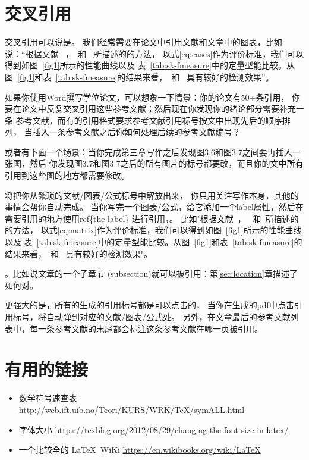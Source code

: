 \section{交叉引用}\label{sec:ref}
交叉引用可以说是。
我们经常需要在论文中引用文献和文章中的图表，比如说：“根据文献
~\cite{shen2017label}，~\cite{shen2016object}和~\cite{shen2017deepskeleton}
所描述的的方法，
以式\ref{eq:cases}作为评价标准，我们可以得到如图~\ref{fig1}所示的性能曲线以及
表~\ref{tab:sk-fmeasure}中的定量型能比较。从图~\ref{fig1}和表~\ref{tab:sk-fmeasure}的结果来看，~\cite{shen2016object}和~\cite{shen2017deepskeleton}
具有较好的检测效果”。

如果你使用Word撰写学位论文，可以想象一下情景：你的论文有50+条引用，
你要在论文中反复交叉引用这些参考文献；然后现在你发现你的绪论部分需要补充一条
参考文献，而有的引用格式要求参考文献引用标号按文中出现先后的顺序排列，
当插入一条参考文献之后你如何处理后续的参考文献编号？


或者有下面一个场景：当你完成第三章写作之后发现图3.6和图3.7之间要再插入一张图，然后
你发现图3.7和图3.7之后的所有图片的标号都要改，而且你的文中所有引用到这些图的地方都需要修改。

\textbf{}将把你从繁琐的文献/图表/公式标号中解放出来，
你只用关注写作本身，其他的事情会帮你自动完成。
%
当你写完一个图表/公式，给它添加一个label属性，然后在需要引用的地方使用ref\{the-label\}
进行引用，。
%
比如"根据文献~\cite{shen2017label}，~\cite{shen2016object}
和~\cite{shen2017deepskeleton}所描述的的方法，
以式\ref{eq:matrix}作为评价标准，我们可以得到如图~\ref{fig1}所示的性能曲线以及
表~\ref{tab:sk-fmeasure}中的定量型能比较。从图~\ref{fig1}和表~\ref{tab:sk-fmeasure}的结果来看，~\cite{shen2016object}和~\cite{shen2017deepskeleton}
具有较好的检测效果"。

。比如说文章的一个子章节
(subsection)就可以被引用：第\ref{sec:location}章描述了如何对。

更强大的是，所有的生成的引用标号都是可以点击的，
当你在生成的pdf中点击引用标号，将自动弹到对应的文献/图表/公式处。
%
另外，在文章最后的参考文献列表中，每一条参考文献的末尾都会标注这条参考文献在哪一页被引用。

%

\pagebreak
\section{有用的链接}
\begin{itemize}
	\item 数学符号速查表 \url{http://web.ift.uib.no/Teori/KURS/WRK/TeX/symALL.html}
	\item 字体大小 \url{https://texblog.org/2012/08/29/changing-the-font-size-in-latex/}
	\item 一个比较全的 \LaTeX \ WiKi \url{https://en.wikibooks.org/wiki/LaTeX}
\end{itemize}

